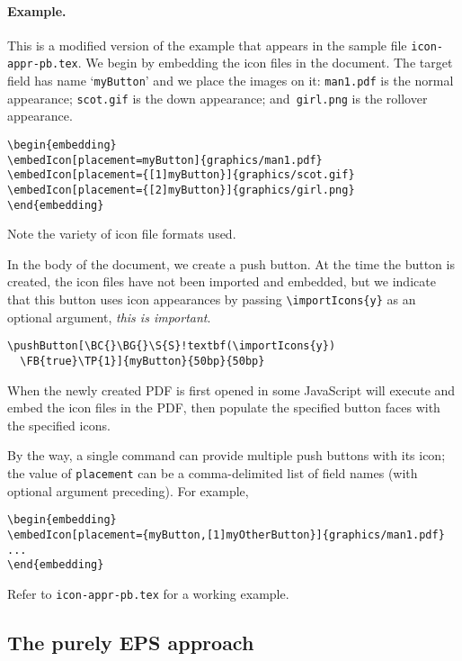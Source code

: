 \documentclass{article}
\def\mpFmt{\raggedleft\itshape\small}
\begin{document}
\paragraph*{Example.} This is a modified version of the example that appears
in the sample file \texttt{icon-appr-pb.tex}. We begin by embedding the icon
files in the document. The target field has name `\texttt{myButton}' and we
place the images on it: \texttt{man1.pdf} is the normal appearance;
\texttt{scot.gif} is the down appearance; and\texttt{ girl.png} is the
rollover appearance.
\begin{Verbatim}[xleftmargin=\parindent,fontsize=\small]
\begin{embedding}
\embedIcon[placement=myButton]{graphics/man1.pdf}
\embedIcon[placement={[1]myButton}]{graphics/scot.gif}
\embedIcon[placement={[2]myButton}]{graphics/girl.png}
\end{embedding}
\end{Verbatim}
Note the variety of icon file formats used.

In the body of the document, we create a push button. At the time
the button is created, the icon files have not been imported and embedded,
but we indicate that this button uses icon appearances by passing
\verb~\importIcons{y}~ as an optional argument, \emph{this is
important}.\marginpar{\mpFmt Important!}
\begin{Verbatim}[xleftmargin=\parindent,fontsize=\small,commandchars=!()]
\pushButton[\BC{}\BG{}\S{S}!textbf(\importIcons{y})
  \FB{true}\TP{1}]{myButton}{50bp}{50bp}
\end{Verbatim}
When the newly created PDF is first opened in  some JavaScript
will execute and embed the icon files in the PDF, then populate the specified
button faces with the specified icons.

By the way, a single  command can provide multiple push buttons with
its icon; the value of \texttt{placement} can be a comma-delimited list of
field names (with optional argument preceding). For example,
\begin{Verbatim}[xleftmargin=\parindent,fontsize=\small]
\begin{embedding}
\embedIcon[placement={myButton,[1]myOtherButton}]{graphics/man1.pdf}
...
\end{embedding}
\end{Verbatim}
Refer to \texttt{icon-appr-pb.tex} for a working example.


\subsection{The purely EPS approach}\label{s:EPSMethods}
\end{document}
